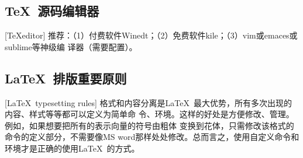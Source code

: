 \subsection{\TeX\ 源码编辑器}[\TeX editor]
推荐：（1）付费软件Winedt；（2）免费软件kile；（3）vim或emaces或sublime等神级编
译器（需要配置）。

\subsection{\LaTeX\ 排版重要原则}[\LaTeX\ typesetting rules]
格式和内容分离是\LaTeX\ 最大优势，所有多次出现的内容、样式等等都可以定义为简单命
令、环境。这样的好处是方便修改、管理。例如，如果想要把所有的表示向量的符号由粗体
变换到花体，只需修改该格式的命令的定义部分，不需要像MS
word那样处处修改。总而言之，使用自定义命令和环境才是正确的使用\LaTeX\ 的方式。


